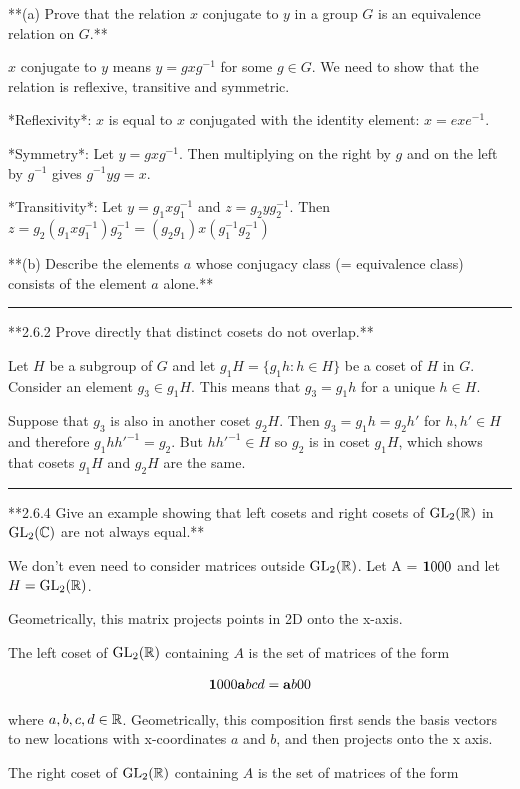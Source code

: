 **(a) Prove that the relation $x$ conjugate to $y$ in a group $G$ is an
  equivalence relation on $G$.**

$x$ conjugate to $y$ means $y = gxg^{-1}$ for some $g \in G$. We need to show
that the relation is reflexive, transitive and symmetric.

*Reflexivity*: $x$ is equal to $x$ conjugated with the identity element: $x = exe^{-1}$.

*Symmetry*: Let $y = gxg^{-1}$. Then multiplying on the right by $g$ and on the
            left by $g^{-1}$ gives $g^{-1}yg = x$.

*Transitivity*: Let $y = g_1xg_1^{-1}$ and $z = g_2yg_2^{-1}$. Then $z =
                g_2(g_1xg_1^{-1})g_2^{-1} = (g_2g_1)x(g_1^{-1}g_2^{-1})$


**(b) Describe the elements $a$ whose conjugacy class (= equivalence class)
consists of the element $a$ alone.**

\hrule

**2.6.2 Prove directly that distinct cosets do not overlap.**

Let $H$ be a subgroup of $G$ and let $g_1H = \{g_1h:h\in H\}$ be a coset of $H$
in $G$. Consider an element $g_3 \in g_1H$. This means that $g_3 = g_1h$ for a
unique $h \in H$.

Suppose that $g_3$ is also in another coset $g_2H$. Then $g_3 = g_1h = g_2h'$
for $h, h' \in H$ and therefore $g_1hh'^{-1} = g_2$. But $hh'^{-1} \in H$ so
$g_2$ is in coset $g_1H$, which shows that cosets $g_1H$ and $g_2H$ are the
same.

\hrule

**2.6.4 Give an example showing that left cosets and right cosets of $\mathrm{GL}_2(\mathbb{R})$
  in $\mathrm{GL}_2(\mathbb{C})$ are not always equal.**

We don't even need to consider matrices outside $\mathrm{GL}_2(\mathbb{R})$. Let A =
$\tiny{\mathbf{1}{0}{0}{0}}$ and let $H = \mathrm{GL}_2(\mathbb{R})$.

Geometrically, this matrix projects points in 2D onto the x-axis.

The left coset of $\mathrm{GL}_2(\mathbb{R})$ containing $A$ is the set of matrices of the form

$$
\tiny{\mathbf{1}{0}{0}{0}} \tiny{\mathbf{a}{b}{c}{d}} = \tiny{\mathbf{a}{b}{0}{0}}
$$

where $a,b,c,d \in \mathbb{R}$. Geometrically, this composition first sends the basis
vectors to new locations with x-coordinates $a$ and $b$, and then projects onto
the x axis.

The right coset of $\mathrm{GL}_2(\mathbb{R})$ containing $A$ is the set of matrices of the form

